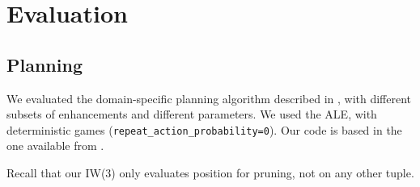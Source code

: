 \chapter{Evaluation}
\section{Planning\label{sec:score-planning}}
We evaluated the domain-specific planning algorithm described in
, with different subsets of enhancements and different
parameters. We used the \ac{ALE}, with deterministic games
(\verb-repeat_action_probability=0-). Our code is based in the one available
from \citet{lipovetzky2015classical}.

Recall that our \ac{IW}(3) only evaluates position for pruning, not
on any other tuple.

